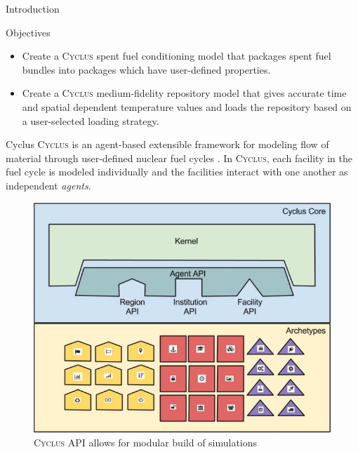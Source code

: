 \documentclass[final]{beamer}
\newlength{\onecolwid}
\newlength{\threecolwid}
\newcommand{\Cyclus}{\textsc{Cyclus}\xspace}%
\begin{document}
\begin{frame}[t]
\begin{columns}[t,totalwidth=\threecolwid]
\begin{column}{\onecolwid}
\begin{block}{Introduction}
\end{block}

\begin{alertblock}{Objectives}
\begin{itemize}
        \item Create a \Cyclus spent fuel conditioning model that packages spent fuel 
        bundles into packages which have user-defined properties. 
		\item Create a \Cyclus medium-fidelity repository model that gives accurate 
		time and spatial dependent temperature values and loads the repository
		based on a user-selected loading strategy. 
\end{itemize}

\end{alertblock}


\begin{block}{Cyclus}
\Cyclus is an agent-based extensible framework for modeling flow of material 
through user-defined nuclear fuel cycles \cite{huff_fundamental_2016}. 
In \Cyclus, each facility in the fuel cycle is modeled individually 
and the facilities interact with one another as independent \textit{agents}. 
\begin{figure}
	\includegraphics[width=0.9\linewidth]{Cyclus_graph}
	\caption{\Cyclus API allows for modular build of simulations \cite{huff_fundamental_2016}}
\end{figure}


\end{block}
\end{column}
\end{columns}
\end{frame}
\end{document}
